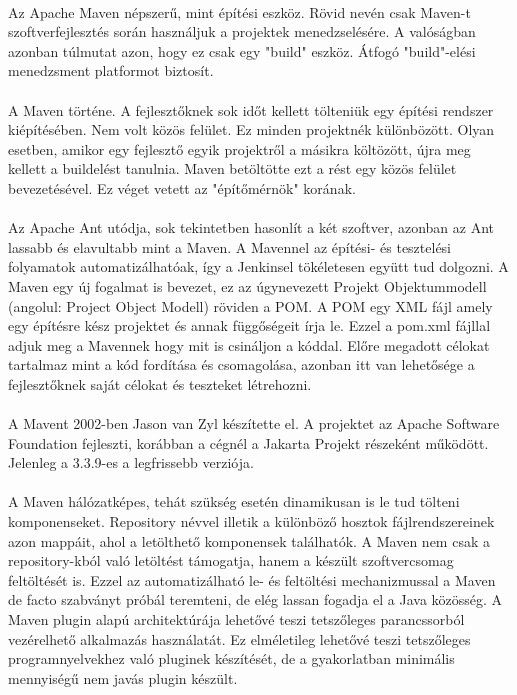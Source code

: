 \paragraph{}
Az Apache Maven népszerű, mint építési eszköz. Rövid nevén csak Maven-t szoftverfejlesztés során használjuk a projektek menedzselésére. 
A valóságban azonban túlmutat azon, hogy ez csak egy "build" eszköz.
Átfogó "build"-elési menedzsment platformot biztosít.
\paragraph{}
A Maven történe.
A fejlesztőknek sok időt kellett tölteniük egy építési rendszer kiépítésében. Nem volt közös felület.
Ez minden projektnék különbözött. Olyan esetben, amikor egy fejlesztő egyik projektről a másikra költözött, újra meg kellett a buildelést tanulnia.
Maven betöltötte ezt a rést egy közös felület bevezetésével. Ez véget vetett az "építőmérnök" korának.
\paragraph{}
Az Apache Ant utódja, sok tekintetben hasonlít a két szoftver, azonban az Ant lassabb és elavultabb mint a Maven. 
A Mavennel az építési- és tesztelési folyamatok automatizálhatóak, így a Jenkinsel tökéletesen együtt tud dolgozni. 
A Maven egy új fogalmat is bevezet, ez az úgynevezett Projekt Objektummodell (angolul: Project Object Modell) röviden a POM. 
A POM egy XML fájl amely egy építésre kész projektet és annak függőségeit írja le. 
Ezzel a pom.xml fájllal adjuk meg a Mavennek hogy mit is csináljon a kóddal.
Előre megadott célokat tartalmaz mint a kód fordítása és csomagolása, azonban itt van lehetősége a fejlesztőknek saját célokat és teszteket létrehozni. 

\paragraph{}
A Mavent 2002-ben Jason van Zyl készítette el. A projektet az Apache Software Foundation fejleszti, korábban a cégnél a Jakarta Projekt részeként működött. Jelenleg a 3.3.9-es a legfrissebb verziója.

\paragraph{}
A Maven hálózatképes, tehát szükség esetén dinamikusan is le tud tölteni komponenseket.
Repository névvel illetik a különböző hosztok fájlrendszereinek azon mappáit, ahol a letölthető komponensek találhatók.
A Maven nem csak a repository-kból való letöltést támogatja, hanem a készült szoftvercsomag feltöltését is. 
Ezzel az automatizálható le- és feltöltési mechanizmussal a Maven de facto szabványt próbál teremteni, de elég lassan fogadja el a Java közösség.
A Maven plugin alapú architektúrája lehetővé teszi tetszőleges parancssorból vezérelhető alkalmazás használatát. 
Ez elméletileg lehetővé teszi tetszőleges programnyelvekhez való pluginek készítését, de a gyakorlatban minimális mennyiségű nem javás plugin készült.

